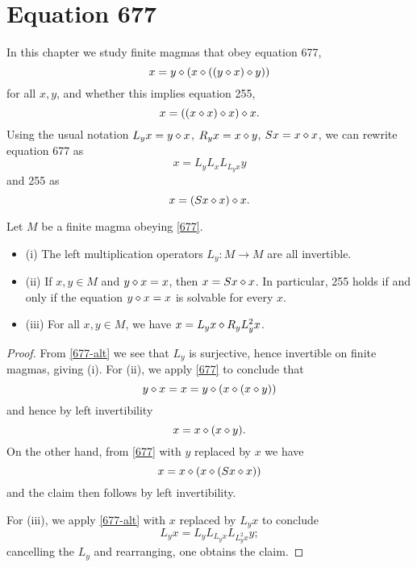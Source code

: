\chapter{Equation 677}\label{677-chapter}

In this chapter we study finite magmas that obey equation 677,
\begin{equation}\label{677}
  x = y \diamond (x \diamond ((y \diamond x) \diamond y))
\end{equation}
for all $x,y$, and whether this implies equation 255,
\begin{equation}\label{255}
  x = ((x \diamond x) \diamond x) \diamond x.
\end{equation}
Using the usual notation $L_y x = y \diamond x$, $R_y x = x \diamond y$, $Sx = x \diamond x$, we can rewrite equation 677 as
\begin{equation}\label{677-alt}
  x = L_y L_x L_{L_y x} y
\end{equation}
and 255 as
$$ x = (Sx \diamond x) \diamond x.$$

\begin{lemma}\label{677-basic} Let $M$ be a finite magma obeying \eqref{677}.
  \begin{itemize}
  \item (i)  The left multiplication operators $L_y: M \to M$ are all invertible.
  \item (ii) If $x,y \in M$ and $y \diamond x = x$, then $x = Sx \diamond x$.  In particular, 255 holds if and only if the equation $y \diamond x = x$ is solvable for every $x$.
  \item (iii)  For all $x,y \in M$, we have $x = L_y x \diamond R_y L_y^2 x$.
\end{itemize}
\end{lemma}

\begin{proof}  From \eqref{677-alt} we see that $L_y$ is surjective, hence invertible on finite magmas, giving (i).  For (ii), we apply \eqref{677} to conclude that
  $$ y \diamond x = x = y \diamond (x \diamond (x \diamond y))$$
  and hence by left invertibility
  $$ x = x \diamond (x \diamond y).$$
  On the other hand, from \eqref{677} with $y$ replaced by $x$ we have
  $$ x = x \diamond (x \diamond (Sx \diamond x))$$
  and the claim then follows by left invertibility.

  For (iii), we apply \eqref{677-alt} with $x$ replaced by $L_y x$ to conclude
  $$ L_y x = L_y L_{L_y x} L_{L^2_y x} y;$$
  cancelling the $L_y$ and rearranging, one obtains the claim.
\end{proof}

